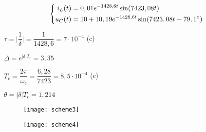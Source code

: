 \begin{enumerate}
$$
    \left\{
    \begin{aligned}
      i_L(t) &= 0,01e^{-1428,6t}\sin(7423,08t) \\
      \vspace{2mm}
      u_C(t) &= 10 + 10,19e^{-1428,6t}\sin(7423,08t - 79,1^{\circ})
    \end{aligned}
    \right.
$$

\vspace{2mm}
\begin{multicols}{2}
\begin{center}
  $ \tau = \bigg| \dfrac{1}{\delta} \bigg| = \dfrac{1}{1428,6} = 7 \cdot 10^{-4} $ (c)

\vspace{2mm}

  $ \Delta = e^{|\delta|T_{c}} = 3,35 $

  $ T_{c} = \dfrac{2\pi}{\omega_{c}} = \dfrac{6,28}{7423} = 8,5 \cdot 10^{-4} $ (c)

\vspace{2mm}

  $ \theta = | \delta |T_{c} = 1,214 $
\end{center}
\end{multicols}

\begin{figure}[h]
\begin{minipage}[h]{0.45\linewidth}

\begin{center}
  \texttt{[image: scheme3]}
  \caption{\label{sch3}}
\end{center}

\end{minipage}
\hfill
\begin{minipage}[h]{0.45\linewidth}

  \texttt{[image: scheme4]}
  \caption{\label{sch4}}

\end{minipage}
\end{figure}

\end{enumerate}

\clearpage

